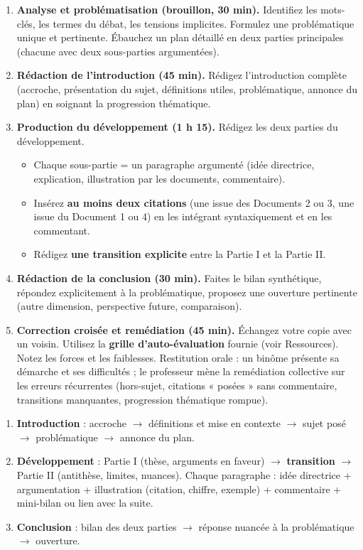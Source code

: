 \documentclass[11pt]{article}
\newcounter{popsec}
\newcounter{popsub}
\newcommand{\courssub}[1]{%
  \stepcounter{popsub}%
  \par\vspace{9pt}\noindent{\popxbold\fontsize{11.5}{13}\selectfont\color{popink}{\color{poporange}\thepopsec.\thepopsub}\hspace{6pt}#1}\par\nopagebreak\vspace{4pt}
}
\begin{document}
\begin{enumerate}
    \item \textbf{Analyse et problématisation (brouillon, 30 min).} Identifiez les mots-clés, les termes du débat, les tensions implicites. Formulez une problématique unique et pertinente. Ébauchez un plan détaillé en deux parties principales (chacune avec deux sous-parties argumentées).
    \item \textbf{Rédaction de l'introduction (45 min).} Rédigez l'introduction complète (accroche, présentation du sujet, définitions utiles, problématique, annonce du plan) en soignant la progression thématique.
    \item \textbf{Production du développement (1 h 15).} Rédigez les deux parties du développement.
        \begin{itemize}
            \item Chaque sous-partie = un paragraphe argumenté (idée directrice, explication, illustration par les documents, commentaire).
            \item Insérez \textbf{au moins deux citations} (une issue des Documents 2 ou 3, une issue du Document 1 ou 4) en les intégrant syntaxiquement et en les commentant.
            \item Rédigez \textbf{une transition explicite} entre la Partie I et la Partie II.
        \end{itemize}
    \item \textbf{Rédaction de la conclusion (30 min).} Faites le bilan synthétique, répondez explicitement à la problématique, proposez une ouverture pertinente (autre dimension, perspective future, comparaison).
    \item \textbf{Correction croisée et remédiation (45 min).} Échangez votre copie avec un voisin. Utilisez la \textbf{grille d'auto-évaluation} fournie (voir Ressources). Notez les forces et les faiblesses. Restitution orale : un binôme présente sa démarche et ses difficultés ; le professeur mène la remédiation collective sur les erreurs récurrentes (hors-sujet, citations « posées » sans commentaire, transitions manquantes, progression thématique rompue).
\end{enumerate}

\courssub{Ressources à mobiliser}
\begin{methode}
\begin{enumerate}
    \item \textbf{Introduction} : accroche $\rightarrow$ définitions et mise en contexte $\rightarrow$ sujet posé $\rightarrow$ problématique $\rightarrow$ annonce du plan.
    \item \textbf{Développement} : Partie I (thèse, arguments en faveur) $\rightarrow$ \textbf{transition} $\rightarrow$ Partie II (antithèse, limites, nuances). Chaque paragraphe : idée directrice + argumentation + illustration (citation, chiffre, exemple) + commentaire + mini-bilan ou lien avec la suite.
    \item \textbf{Conclusion} : bilan des deux parties $\rightarrow$ réponse nuancée à la problématique $\rightarrow$ ouverture.
\end{enumerate}
\end{methode}
\end{document}
